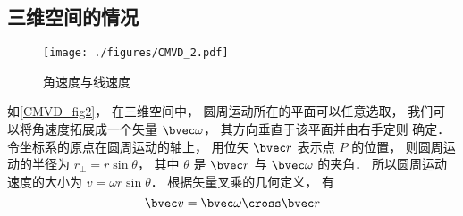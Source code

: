 \subsection{三维空间的情况}\label{CMVD_sub1}

\begin{figure}[ht]
\centering
\texttt{[image: ./figures/CMVD\_2.pdf]}
\caption{角速度与线速度} \label{CMVD_fig2}
\end{figure}

如\autoref{CMVD_fig2}， 在三维空间中， 圆周运动所在的平面可以任意选取， 我们可以将角速度拓展成一个矢量 $\bvec\omega$， 其方向垂直于该平面并由右手定则 确定． 令坐标系的原点在圆周运动的轴上， 用位矢 $\bvec r$ 表示点 $P$ 的位置， 则圆周运动的半径为 $r_\bot = r \sin\theta$， 其中 $\theta$ 是 $\bvec r$ 与 $\bvec \omega$ 的夹角． 所以圆周运动速度的大小为 $v = \omega r \sin\theta$． 根据矢量叉乘的几何定义， 有
\begin{equation}\label{CMVD_eq5}
\bvec v = \bvec\omega \cross \bvec r
\end{equation}
